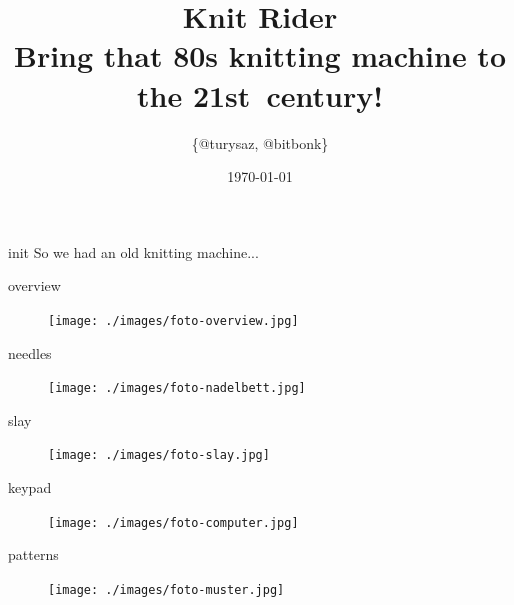 


\author{\{@turysaz, @bitbonk\}}
\title{\Huge{Knit Rider}\\
    \large{Bring that 80s knitting machine to the \mbox{21st century}!}
}

\date{\today{}}



\maketitle

\begin{frame}{init}
    So we had an old knitting machine...
\end{frame}

\begin{frame}{overview}
    \begin{figure}
        \texttt{[image: ./images/foto-overview.jpg]}
    \end{figure}
\end{frame}

\begin{frame}{needles}
    \begin{figure}
        \texttt{[image: ./images/foto-nadelbett.jpg]}
    \end{figure}
\end{frame}

\begin{frame}{slay}
    \begin{figure}
        \texttt{[image: ./images/foto-slay.jpg]}
    \end{figure}
\end{frame}

\begin{frame}{keypad}
    \begin{figure}
        \texttt{[image: ./images/foto-computer.jpg]}
    \end{figure}
\end{frame}

\begin{frame}{patterns}
    \begin{figure}
        \texttt{[image: ./images/foto-muster.jpg]}
    \end{figure}
\end{frame}

